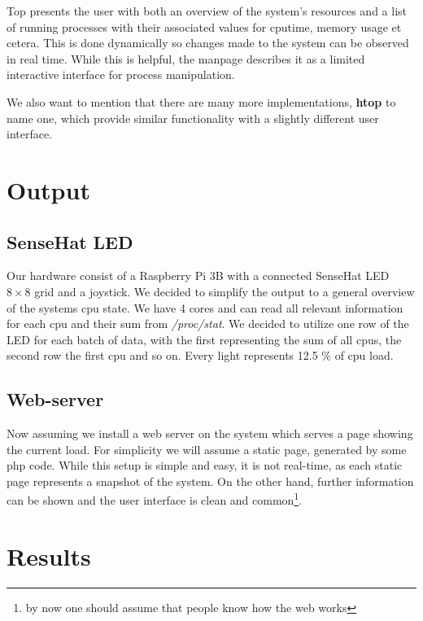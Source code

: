 \documentclass[twoside,twocolumn]{article}
\begin{document}
Top presents the user with both an overview of the system's resources and a list
of running processes with their associated values for cputime, memory usage et
cetera. This is done dynamically so changes made to the system can be observed
in real time. While this is helpful, the manpage describes it as a limited 
interactive interface for process manipulation. 

We also want to mention that there are many more implementations,
\textbf{htop} to name one, which provide similar functionality with a slightly
different user interface. 


\section{Output}

\subsection{SenseHat LED}

Our hardware consist of a Raspberry Pi 3B with a connected SenseHat LED $8\times
8$ grid and a joystick. We decided to simplify the output to a general overview
of the systems cpu state. We have 4 cores and can read all relevant
information for each cpu and their sum from \textit{/proc/stat}. We decided to
utilize one row of the LED for each batch of data, with the first representing the
sum of all cpus, the second row the first cpu and so on. Every light represents
12.5 \% of cpu load. 

\subsection{Web-server}

Now assuming we install a web server on the system which serves a page showing
the current load. For simplicity we will assume a static page, generated by some
php code. While this setup is simple and easy, it is not real-time, as each
static page represents a snapshot of the system. On the other hand, further
information can be shown and the user interface is clean and common\footnote{by
	now one should assume that people know how the web works}.

\section{Results}
\end{document}
